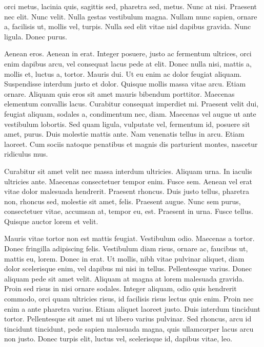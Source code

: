 \documentclass[letterpaper,twocolumn]{article}
\begin{document}
orci metus, lacinia quis, sagittis sed, pharetra sed, metus. Nunc at nisi.
Praesent nec elit. Nunc velit. Nulla
\sparkscale=10pt
\sparkunit=0.5pt
\sparkymin=0pt
gestas vestibulum magna. Nullam nunc sapien, ornare a, facilisis ut, mollis
vel, turpis. Nulla sed elit vitae nisl 
\sparkscale=200pt
dapibus gravida. Nunc ligula. Donec purus.

Aenean eros. Aenean in erat. Integer posuere, justo ac fermentum
ultrices, orci enim dapibus arcu, vel consequat lacus pede at
elit. Donec nulla nisi, mattis a, mollis et, luctus a, tortor. Mauris
dui. Ut eu enim ac dolor feugiat aliquam. Suspendisse interdum justo
et dolor. Quisque mollis massa vitae arcu. Etiam ornare. Aliquam quis
eros sit amet mauris bibendum porttitor. Maecenas elementum convallis
lacus. Curabitur consequat imperdiet mi. Praesent velit dui, feugiat
aliquam, sodales a, condimentum nec, diam. Maecenas vel augue ut ante
vestibulum lobortis. Sed quam ligula, vulputate vel, fermentum id,
posuere sit amet, purus. Duis molestie mattis ante. Nam venenatis
tellus in arcu. Etiam laoreet. Cum sociis natoque penatibus et magnis
dis parturient montes, nascetur ridiculus mus.

Curabitur sit amet velit nec massa interdum ultricies. Aliquam
urna. In iaculis ultricies ante. Maecenas consectetuer tempor
enim. Fusce sem. Aenean vel erat vitae dolor malesuada
hendrerit. Praesent rhoncus. Duis justo tellus, pharetra non, rhoncus
sed, molestie sit amet, felis. Praesent augue. Nunc sem purus,
consectetuer vitae, accumsan at, tempor eu, est. Praesent in
urna. Fusce tellus. Quisque auctor lorem et velit.

Mauris vitae tortor non est mattis feugiat. Vestibulum odio. Maecenas
a tortor. Donec fringilla adipiscing felis. Vestibulum diam risus,
ornare ac, faucibus ut, mattis eu, lorem. Donec in erat. Ut mollis,
nibh vitae pulvinar aliquet, diam dolor scelerisque enim, vel dapibus
mi nisi in tellus. Pellentesque varius. Donec aliquam pede sit amet
velit. Aliquam at magna at lorem malesuada gravida. Proin sed risus in
nisi ornare sodales. Integer aliquam, odio quis hendrerit commodo,
orci quam ultricies risus, id facilisis risus lectus quis enim. Proin
nec enim a ante pharetra varius. Etiam aliquet laoreet justo. Duis
interdum tincidunt tortor. Pellentesque sit amet mi ut libero varius
pulvinar. Sed rhoncus, arcu id tincidunt tincidunt, pede sapien
malesuada magna, quis ullamcorper lacus arcu non justo. Donec turpis
elit, luctus vel, scelerisque id, dapibus vitae, leo.
\end{document}
